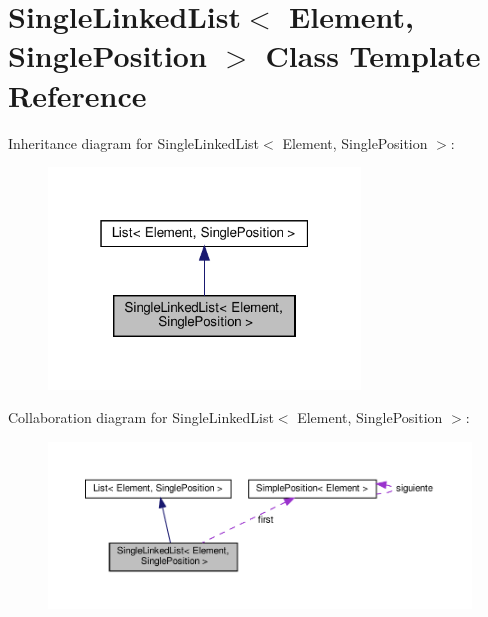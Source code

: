 \hypertarget{class_single_linked_list}{}\section{Single\+Linked\+List$<$ Element, Single\+Position $>$ Class Template Reference}
\label{class_single_linked_list}


Inheritance diagram for Single\+Linked\+List$<$ Element, Single\+Position $>$\+:\nopagebreak
\begin{figure}[H]
\begin{center}
\leavevmode
\includegraphics[width=235pt]{class_single_linked_list__inherit__graph}
\end{center}
\end{figure}


Collaboration diagram for Single\+Linked\+List$<$ Element, Single\+Position $>$\+:\nopagebreak
\begin{figure}[H]
\begin{center}
\leavevmode
\includegraphics[width=350pt]{class_single_linked_list__coll__graph}
\end{center}
\end{figure}
